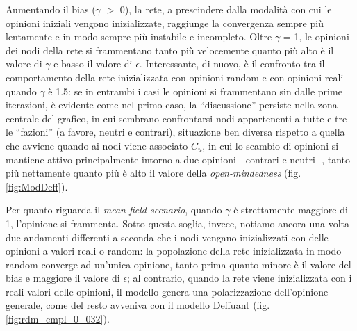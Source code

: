     Aumentando il bias ($\gamma$ $>$ 0), la rete, a prescindere dalla modalità con cui le opinioni iniziali vengono inizializzate, raggiunge la convergenza sempre più lentamente e in modo sempre più instabile e incompleto. Oltre $\gamma$ = 1, le opinioni dei nodi della rete si frammentano tanto più velocemente quanto più alto è il valore di $\gamma$ e basso il valore di $\epsilon$. Interessante, di nuovo, è il confronto tra il comportamento della rete inizializzata con opinioni random e con opinioni reali quando $\gamma$ è 1.5: se in entrambi i casi le opinioni si frammentano sin dalle prime iterazioni, è evidente come nel primo caso, la “discussione” persiste nella zona centrale del grafico, in cui sembrano confrontarsi nodi appartenenti a tutte e tre le “fazioni” (a favore, neutri e contrari), situazione ben diversa rispetto a quella che avviene quando ai nodi viene associato $C_{u}$, in cui lo scambio di opinioni si mantiene attivo principalmente intorno a due opinioni - contrari e neutri -, tanto più nettamente quanto più è alto il valore della \textit{open-mindedness} (fig. \ref{fig:ModDeff}).
    
    Per quanto riguarda il \textit{mean field scenario}, quando $\gamma$ è strettamente maggiore di 1, l’opinione si frammenta. Sotto questa soglia, invece, notiamo ancora una volta due andamenti differenti a seconda che i nodi vengano inizializzati con delle opinioni a valori reali o random: la popolazione della rete inizializzata in modo random converge ad un'unica opinione, tanto prima quanto minore è il valore del bias e maggiore il valore di $\epsilon$; al contrario, quando la rete viene inizializzata con i reali valori delle opinioni, il modello genera una polarizzazione dell’opinione generale, come del resto avveniva con il modello Deffuant (fig. \ref{fig:rdm_cmpl_0_032}). 
    
  